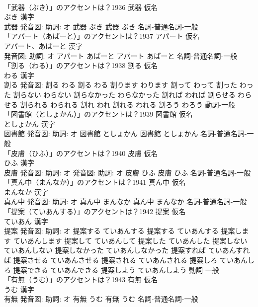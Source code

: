 \documentclass[8pt]{extreport}
\begin{document}
\begin{CJK}{UTF8}{min}
\\	「武器（ぶき）」のアクセントは？1936	武器 仮名　
\\	ぶき 漢字　
\\	武器 発音図: 助詞: オ	武器 ぶき		武器 ぶき				名詞-普通名詞-一般 
\\	「アパート（あぱーと）」のアクセントは？1937	アパート 仮名　
\\	アパート、あぱーと 漢字　
\\	発音図: 助詞: オ	アパート あぱーと		アパート あぱーと				名詞-普通名詞-一般 
\\	「割る（わる）」のアクセントは？1938	割る 仮名　
\\	わる 漢字　
\\	割る 発音図:	割る わる		割る わる 割ります わります 割って わって 割った わった 割らない わらない 割らなかった わらなかった 割れば われば 割らせる わらせる 割られる わられる 割れ われ 割れる われる 割ろう わろう				動詞-一般 
\\	「図書館（としょかん）」のアクセントは？1939	図書館 仮名　
\\	としょかん 漢字　
\\	図書館 発音図: 助詞: オ	図書館 としょかん		図書館 としょかん				名詞-普通名詞-一般 
\\	「皮膚（ひふ）」のアクセントは？1940	皮膚 仮名　
\\	ひふ 漢字　
\\	皮膚 発音図: 助詞: オ 発音図: 助詞: オ	皮膚 ひふ		皮膚 ひふ				名詞-普通名詞-一般 
\\	「真ん中（まんなか）」のアクセントは？1941	真ん中 仮名　
\\	まんなか 漢字　
\\	真ん中 発音図: 助詞: オ	真ん中 まんなか		真ん中 まんなか				名詞-普通名詞-一般 
\\	「提案（ていあんする）」のアクセントは？1942	提案 仮名　
\\	ていあん 漢字　
\\	提案 発音図: 助詞: オ	提案する ていあんする		提案する ていあんする 提案します ていあんします 提案して ていあんして 提案した ていあんした 提案しない ていあんしない 提案しなかった ていあんしなかった 提案すれば ていあんすれば 提案させる ていあんさせる 提案される ていあんされる 提案しろ ていあんしろ 提案できる ていあんできる 提案しよう ていあんしよう				動詞-一般 
\\	「有無（うむ）」のアクセントは？1943	有無 仮名　
\\	うむ 漢字　
\\	有無 発音図: 助詞: オ	有無 うむ		有無 うむ				名詞-普通名詞-一般 

\end{CJK}
\end{document}
